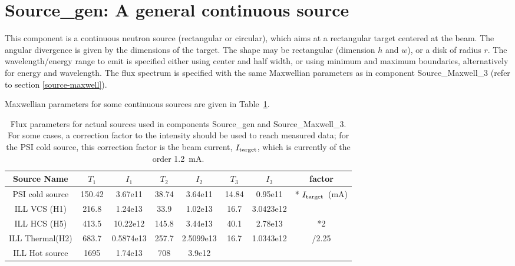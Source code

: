 \section{Source\_gen: A general continuous source}
\label{source-gen}


This component is a continuous neutron source (rectangular or circular), which aims at
a rectangular target centered at the beam. 
The angular divergence is given by the dimensions of the target. 
The shape may be rectangular (dimension $h$ and $w$), or a disk of radius $r$. 
The wavelength/energy range to emit is specified either using center and half width, or using minimum and maximum boundaries, alternatively for energy and wavelength.
The flux spectrum is specified with the same Maxwellian parameters as in component Source\_Maxwell\_3 (refer to section \ref{source-maxwell}).

Maxwellian parameters for some continuous sources 
are given in Table~\ref{t:source-params}. 

\begin{table}
  \begin{center}
  {\let\my=\\
    \begin{tabular}{|c|cccccc|c|}
    \hline
    Source Name & $T_1$ & $I_1$ & $T_2$ & $I_2$ & $T_3$ & $I_3$ & factor \\
    \hline
    PSI cold source & 150.42 & 3.67e11   & 38.74 & 3.64e11    & 14.84& 0.95e11    & * $I_{\rm target}$~(mA)\\
    ILL VCS (H1)    & 216.8  & 1.24e13   & 33.9  & 1.02e13    & 16.7 & 3.0423e12  &\\
    ILL HCS (H5)    & 413.5  & 10.22e12  & 145.8 & 3.44e13    & 40.1 & 2.78e13    & *2\\
    ILL Thermal(H2) & 683.7  & 0.5874e13 & 257.7 & 2.5099e13  & 16.7 & 1.0343e12  & /2.25\\
    ILL Hot source  & 1695   & 1.74e13   & 708   & 3.9e12     &      &            &\\ \hline
    \end{tabular}
    \caption{Flux parameters for actual sources used in components
             Source\_gen and Source\_Maxwell\_3.
             For some cases, a correction factor to the intensity 
             should be used to reach measured data; for the PSI cold source,
             this correction factor is the beam current, $I_{\rm target}$,
             which is currently of the order 1.2~mA.
}
    \label{t:source-params}
  }
  \end{center}
\end{table}